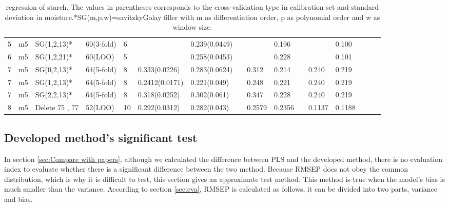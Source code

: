 \documentclass[a4paper,12pt,titlepage]{article} %
\numberwithin{equation}{section}  %
\begin{document}
\begin{landscape}
\begin{table}[]
\begin{tabular}{llllllllllllllll}
				5                    & m5                   & SG(1,2,13)*           & 60(3-fold) & 6  &                & 0.239(0.0449) &   &        & 0.196  &   &        & 0.100          &         &    &               \\
				6                    & m5                   & SG(1,2,21)*           & 60(LOO)    & 5  &                & 0.258(0.0453) &   &        & 0.228  &   &        & 0.101          &         &    &               \\
				7                    & m5                   & SG(0,2,13)*           & 64(5-fold) & 8  & 0.333(0.0226)  & 0.283(0.0624) &   & 0.312  & 0.214  &   & 0.240  & 0.219          &         &    &               \\
				7                    & m5                   & SG(1,2,13)*           & 64(5-fold) & 8  & 0.2412(0.0171) & 0.221(0.049)  &   & 0.248  & 0.221  &   & 0.240  & 0.219          &         &    &               \\
				7                    & m5                   & SG(2,2,13)*           & 64(5-fold) & 8  & 0.318(0.0252)  & 0.302(0.061)  &   & 0.347  & 0.228  &   & 0.240  & 0.219          &         &    &               \\
				8                    & m5                   & Delete 75 , 77       & 52(LOO)    & 10 & 0.292(0.0312)  & 0.282(0.043)  &   & 0.2579 & 0.2356 &   & 0.1137 & 0.1188         &         &    &               
			\end{tabular}
			
			\caption{regression of starch. The values in parentheses corresponds to the cross-validation type in calibration set and standard deviation in moisture.*SG(m,p,w)=savitzkyGolay filler with m as differentiation order, p as polynomial order and w as window size.}
			\label{tab:starch}
		\end{table}
	\end{landscape}
	
	
	
	\subsection{Developed method's significant test}
	\label{sec: test}
	
	In section \ref{sec:Compare with papers}, although we calculated the difference between PLS and the developed method, there is no evaluation index to evaluate whether there is a significant difference between the two method. Because RMSEP does not obey the common distribution, which is why it is difficult to test, this section gives an approximate test method. This method is true when the model's bias is much smaller than the variance. According to section \ref{sec:eva}, RMSEP is calculated as follows, it can be divided into two parts, variance and bias.
	
\end{document}
